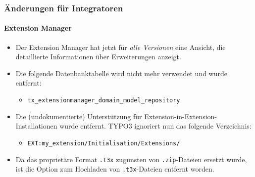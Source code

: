 %

\begin{frame}[fragile]
	\frametitle{Änderungen für Integratoren}
	\framesubtitle{Extension Manager}

	\begin{itemize}

		\item Der Extension Manager hat jetzt für \textit{alle Versionen} eine Ansicht,
			die detaillierte Informationen über Erweiterungen anzeigt.

		\item Die folgende Datenbanktabelle wird nicht mehr verwendet und wurde entfernt:
			\begin{itemize}\small
				\item \texttt{tx\_extensionmanager\_domain\_model\_repository}
			\end{itemize}\normalsize
			\vspace{0.2cm}

		\item Die (undokumentierte) Unterstützung für Extension-in-Extension-Installationen
			wurde entfernt. TYPO3 ignoriert nun das folgende Verzeichnis:
			\begin{itemize}\small
				\item \texttt{EXT:my\_extension/Initialisation/Extensions/}
			\end{itemize}
			\vspace{0.2cm}

		\item Da das proprietäre Format \texttt{.t3x} zugunsten von
			\texttt{.zip}-Dateien ersetzt wurde, ist die Option zum Hochladen von \texttt{.t3x}-Dateien
			entfernt worden.

	\end{itemize}

\end{frame}

